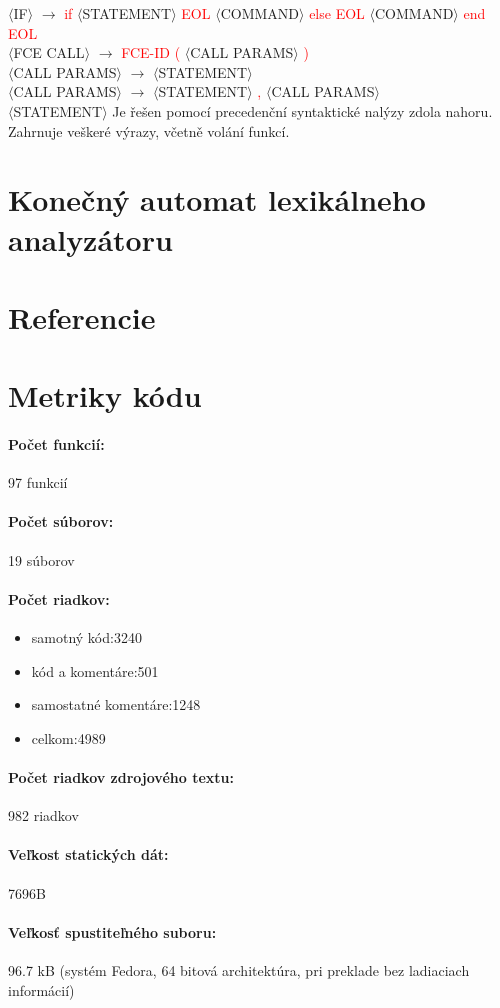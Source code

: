 \documentclass[12pt,a4paper,titlepage,final]{article}
\begin{document}
   $\langle$IF$\rangle$ $\rightarrow$  \textcolor{red} {if} $\langle$STATEMENT$\rangle$ \textcolor{red} {EOL} $\langle$COMMAND$\rangle$ \textcolor{red} {else}  \textcolor{red} {EOL} $\langle$COMMAND$\rangle$ \textcolor{red} {end}  \textcolor{red} {EOL}  \\
   $\langle$FCE CALL$\rangle$ $\rightarrow$  \textcolor{red} {FCE-ID}  \textcolor{red} {(} $\langle$CALL PARAMS$\rangle$ \textcolor{red} {)}  \\
   $\langle$CALL PARAMS$\rangle$ $\rightarrow$ $\langle$STATEMENT$\rangle$ \\
   $\langle$CALL PARAMS$\rangle$ $\rightarrow$ $\langle$STATEMENT$\rangle$ \textcolor{red} {,} $\langle$CALL PARAMS$\rangle$ \\
   $\langle$STATEMENT$\rangle$ Je řešen pomocí precedenční syntaktické nalýzy zdola nahoru. Zahrnuje veškeré výrazy, včetně volání funkcí. \\
\newpage


\newpage
\section{Konečný automat lexikálneho analyzátoru}

\newpage

\section{Referencie}





\newpage
\section{Metriky kódu}

\paragraph{Počet funkcií:} 97 funkcií
\paragraph{Počet súborov:} 19 súborov
\paragraph{Počet riadkov:}
\begin{itemize}
\item	  samotný kód:3240
\item	  kód a komentáre:501
\item	  samostatné komentáre:1248
\item	  celkom:4989
\end{itemize}
\paragraph{Počet riadkov zdrojového textu:} 982  riadkov
\paragraph{Veľkost statických dát:} 7696B
\paragraph{Veľkosť spustiteľného suboru:} 96.7 kB (systém Fedora, 64 bitová
architektúra, pri preklade bez ladiaciach informácií)

\newpage 
\end{document}
